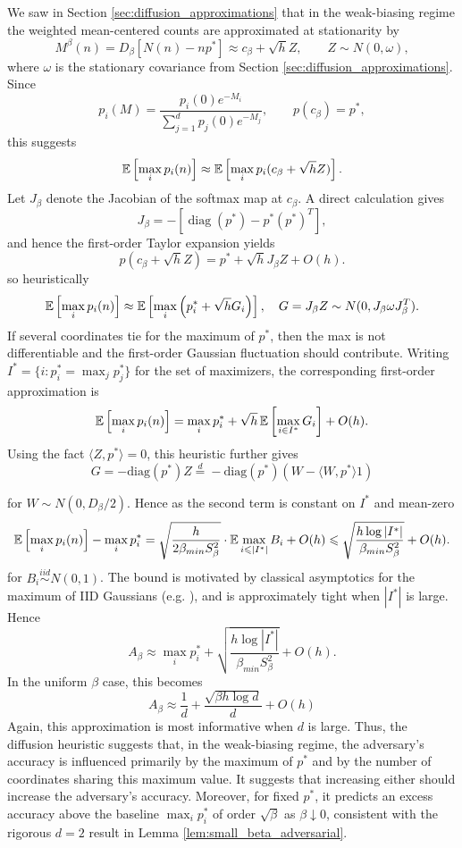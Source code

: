 We saw in Section \ref{sec:diffusion_approximations} that in the weak-biasing regime the weighted mean-centered counts are approximated at stationarity by
%
\[M^\beta(n) = D_\beta [N(n) - np^*] \approx c_\beta + \sqrt{h} Z, \qquad Z \sim N(0,\omega),\]
%
\noindent where $\omega$ is the stationary covariance from Section \ref{sec:diffusion_approximations}. Since
%
\[p_i(M) = \frac{p_i(0)e^{-M_i}}{\sum_{j=1}^d p_j(0)e^{-M_j}}, \qquad p(c_\beta) = p^*,\]
%
\noindent this suggests
%
\[\mathbb{E}\left[\max_i p_i(n)\right] \approx \mathbb{E}\left[\max_i p_i(c_\beta + \sqrt{h} Z)\right].\]
%
\noindent Let $J_\beta$ denote the Jacobian of the softmax map at $c_\beta$. A direct calculation gives
%
\[J_\beta = -\left[\operatorname{diag}(p^*) - p^*(p^*)^T\right],\]
%
\noindent and hence the first-order Taylor expansion yields
%
\[p(c_\beta + \sqrt{h} Z) = p^* + \sqrt{h}J_\beta Z + O(h).\]
%
\noindent so heuristically
%
\[\mathbb{E}\left[\max_i p_i(n)\right] \approx \mathbb{E}\left[\max_i \left(p_i^* + \sqrt{h} G_i\right)\right], \quad G = J_\beta Z \sim N(0, J_\beta \omega J_\beta^T).\]
%
\noindent If several coordinates tie for the maximum of $p^*$, then the max is not differentiable and the first-order Gaussian fluctuation should contribute. Writing $I^* = \{i : p_i^* = \max_j p_j^*\}$ for the set of maximizers, the corresponding first-order approximation is
%
\[\mathbb{E}\left[\max_i p_i(n)\right] = \max_i p_i^* + \sqrt{h}\,\mathbb{E}\left[\max_{i \in I^*} G_i\right] + O(h).\]
%
\noindent Using the fact $\langle Z, p^* \rangle  = 0$, this heuristic further gives
%
\[G = -\mathrm{diag}(p^*) Z \overset{d}{=} -\mathrm{diag}(p^*)(W - \langle W, p^* \rangle 1) \]

\noindent for $W \sim N(0, D_\beta / 2)$. Hence as the second term is constant on $I^*$ and mean-zero
%
\[\mathbb{E}\left[\max_i p_i(n)\right] - \max_i p_i^* = \sqrt{\frac{h}{2\beta_{min} S_\beta^2}} \cdot \mathbb{E} \max_{i \leqslant |I^*|} B_i + O(h)  \leqslant \sqrt{\frac{h \log | I^*|}{\beta_{min} S_\beta^2}} + O(h).\]
%
\noindent for $B_i \overset{iid}{\sim} N(0,1)$. The bound is motivated by classical
asymptotics for the maximum of IID Gaussians (e.g. \cite{vershynin2026_high_dimensional_probability}), and is
approximately tight when $|I^*|$ is large. Hence
%
\[A_\beta \approx \max_i p_i^* + \sqrt{\frac{h \log | I^*|}{\beta_{min} S_\beta^2}} + O(h).\]
%
\noindent In the uniform $\beta$ case, this becomes
%
\[A_\beta \approx \frac{1}{d} + \frac{\sqrt{\beta h  \log d}}{d} + O(h)\]
%
 Again, this approximation is most informative when $d$ is large. Thus, the diffusion heuristic suggests that, in the weak-biasing regime, the adversary's accuracy is influenced primarily by the maximum of $p^*$ and by the number of coordinates sharing this maximum value. It suggests that increasing either should increase the adversary's accuracy. Moreover, for fixed $p^*$, it predicts an excess accuracy above the baseline $\max_i p_i^*$ of order $\sqrt{\beta}$ as $\beta \downarrow 0$, consistent with the rigorous $d=2$ result in Lemma \ref{lem:small_beta_adversarial}.

